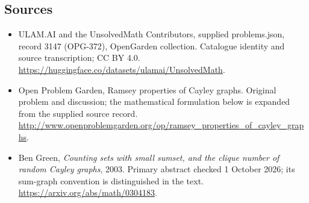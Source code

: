 \documentclass[11pt,a4paper]{article}
\begin{document}
\subsection{Sources}
\begin{itemize}
\item[S1] ULAM.AI and the UnsolvedMath Contributors, supplied problems.json, record 3147 (OPG-372), OpenGarden collection. Catalogue identity and source transcription; CC BY 4.0.
\url{https://huggingface.co/datasets/ulamai/UnsolvedMath}.
\item[S2] Open Problem Garden, Ramsey properties of Cayley graphs. Original problem and discussion; the mathematical formulation below is expanded from the supplied source record.
\url{http://www.openproblemgarden.org/op/ramsey_properties_of_cayley_graphs}.

\item[R1] Ben Green, \emph{Counting sets with small sumset, and the
clique number of random Cayley graphs}, 2003. Primary abstract checked
1 October 2026; its sum-graph convention is distinguished in the text.
\url{https://arxiv.org/abs/math/0304183}.

\end{itemize}
\end{document}
